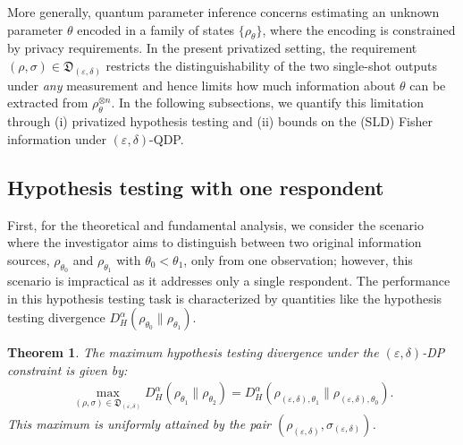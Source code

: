 \documentclass[onecolumn,ldraftcls, 11pt]{IEEEtran}
\newtheorem{theorem}{\bf{Theorem}}
\newcommand{\eps}{\varepsilon}
\begin{document}
More generally, quantum parameter inference concerns estimating an unknown parameter $\theta$ encoded in a family of states
$\{\rho_\theta\}$, where the encoding is constrained by privacy requirements.
In the present privatized setting, the requirement $(\rho,\sigma)\in\mathfrak{D}_{(\eps,\delta)}$ restricts the
distinguishability of the two single-shot outputs under \emph{any} measurement and hence limits how much information about
$\theta$ can be extracted from $\rho_\theta^{\otimes n}$.
In the following subsections, we quantify this limitation through (i) privatized hypothesis testing and (ii) bounds on the
(SLD) Fisher information under $(\eps,\delta)$-QDP.

\subsection{Hypothesis testing with one respondent}
First, for the theoretical and fundamental analysis, we consider the scenario where the investigator aims to distinguish between two original information sources, $\rho_{\theta_0}$ and $\rho_{\theta_1}$ with $\theta_0 < \theta_1$, only from one observation; however, this scenario is impractical as it addresses only a single respondent.
The performance in this hypothesis testing task is characterized by quantities like the hypothesis testing divergence $D_H^\alpha( \rho_{\theta_0}\|\rho_{\theta_1})$.

\begin{theorem}\label{THJ}
The maximum hypothesis testing divergence under the $(\eps,\delta)$-DP constraint is given by:
\begin{align}
\max_{(\rho,\sigma) \in \mathfrak{D}_{(\eps,\delta)}} D_H^\alpha( \rho_{\theta_1}\|\rho_{\theta_2}) 
= D_H^\alpha( \rho_{(\eps,\delta),\theta_1}\|\rho_{(\eps,\delta),\theta_0}).
\end{align}
This maximum is uniformly attained by the pair $(\rho_{(\eps,\delta)}, \sigma_{(\eps,\delta)})$.
\end{theorem}
\end{document}
